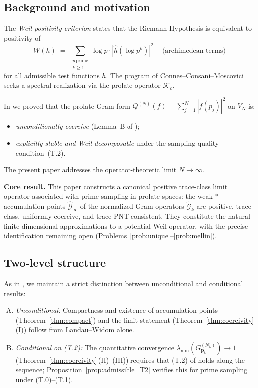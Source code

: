 \documentclass[12pt,a4paper]{amsart}
\theoremstyle{definition}
\newcommand{\Kop}{\mathcal{K}_c}
\newcommand{\GVMk}{G^{(N_k)}_{\mathbf{p}_k}}
\newcommand{\Gcal}{\widehat{\mathcal{G}}}
\begin{document}
\subsection{Background and motivation}

The \emph{Weil positivity criterion} \cite{Weil1952,Bombieri2000}
states that the Riemann Hypothesis is equivalent to positivity of
\[
  W(h)\;=\;
  \sum_{\substack{p\,\text{prime}\\k\geq1}}
  \log p\cdot|\widehat{h}(\log p^k)|^2
  +\text{(archimedean terms)}
\]
for all admissible test functions $h$.
The program of Connes--Consani--Moscovici \cite{CCM_PNAS2022,CCM2025}
seeks a spectral realization via the prolate operator $\Kop$.

In \cite{PaperI} we proved that the prolate Gram form
$Q^{(N)}(f)=\sum_{j=1}^N|f(p_j)|^2$ on $V_N$ is:
\begin{itemize}
\item \emph{unconditionally coercive} (Lemma~B of \cite{PaperI});
\item \emph{explicitly stable and Weil-decomposable} under the
sampling-quality condition~(T.2).
\end{itemize}
The present paper addresses the operator-theoretic limit $N\to\infty$.

\medskip
\noindent\textbf{Core result.}
This paper constructs a canonical positive trace-class limit operator
associated with prime sampling in prolate spaces: the weak-$*$
accumulation points $\Gcal_\infty$ of the normalized Gram operators
$\widetilde{\mathcal{G}}_k$ are positive, trace-class, uniformly
coercive, and trace-PNT-consistent.
They constitute the natural finite-dimensional approximations
to a potential Weil operator, with the precise identification
remaining open (Problems~\ref{prob:unique}--\ref{prob:mellin}).

\subsection{Two-level structure}

As in \cite{PaperI}, we maintain a strict distinction between
unconditional and conditional results:

\begin{enumerate}[(A)]
\item \emph{Unconditional:} Compactness and existence of accumulation
points (Theorem~\ref{thm:compact}) and the limit statement
(Theorem~\ref{thm:coercivity}\,(I)) follow from Landau--Widom alone.
\item \emph{Conditional on (T.2):} The quantitative convergence
$\lambda_{\min}(\GVMk)\to1$ (Theorem~\ref{thm:coercivity}\,(II)--(III))
requires that (T.2) of \cite{PaperI} holds along the sequence;
Proposition~\ref{prop:admissible_T2} verifies this for prime
sampling under (T.0)--(T.1).
\end{enumerate}
\end{document}
